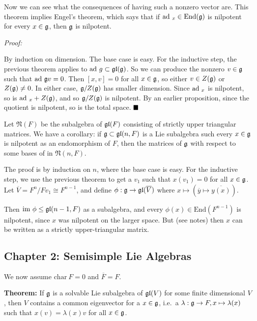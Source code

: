 Now we can see what the consequences of having such a nonzero vector
are. This theorem implies Engel's theorem, which says that if
\(\mathrm{ad}~_x \in \mathrm{End}({\mathfrak{g}})\) is nilpotent for every \(x\in {\mathfrak{g}}\),
then \({\mathfrak{g}}\) is nilpotent.

\emph{Proof:}

By induction on dimension. The base case is easy. For the inductive
step, the previous theorem applies to \(\mathrm{ad}~ g \subset {\mathfrak{gl}}({\mathfrak{g}})\).
So we can produce the nonzero \(v\in {\mathfrak{g}}\) such that
\(\mathrm{ad}~ {\mathfrak{g}} v = 0\). Then \([x, v] = 0\) for all \(x\in{\mathfrak{g}}\), so
either \(v\in Z({\mathfrak{g}})\) or \(Z({\mathfrak{g}}) \neq 0\). In either case,
\({\mathfrak{g}} / Z({\mathfrak{g}})\) has smaller dimension. Since \(\mathrm{ad}~_x\) is
nilpotent, so is \(\mathrm{ad}~_x + Z({\mathfrak{g}})\), and so \({\mathfrak{g}}/Z({\mathfrak{g}})\) is
nilpotent. By an earlier proposition, since the quotient is nilpotent,
so is the total space. \(\qed\)

Let \(\mathfrak{N}(F)\) be the subalgebra of \({\mathfrak{gl}}(F)\) consisting of
strictly upper triangular matrices. We have a corollary: if
\({\mathfrak{g}} \subset {\mathfrak{gl}}(n, F)\) is a Lie subalgebra such every
\(x\in {\mathfrak{g}}\) is nilpotent as an endomorphism of \(F\), then the
matrices of \({\mathfrak{g}}\) with respect to some bases of in
\(\mathfrak{N}(n, F)\).

The proof is by induction on \(n\), where the base case is easy. For the
inductive step, we use the previous theorem to get a \(v_1\) such that
\(x(v_1) = 0\) for all \(x\in {\mathfrak{g}}\). Let
\(\overline V = F^n/Fv_1 \cong F^{n-1}\), and define
\(\phi: {\mathfrak{g}} \to {\mathfrak{gl}}(\overline V)\) where
\(x \mapsto (\overline y \mapsto \overline{y(x)})\).

Then \({\text{im}~} \phi \leq {\mathfrak{gl}}(n-1, F)\) as a subalgebra, and every
\(\phi(x)\in \mathrm{End}(F^{n-1})\) is nilpotent, since \(x\) was
nilpotent on the larger space. But (see notes) then \(x\) can be written
as a strictly upper-triangular matrix.

\hypertarget{chapter-2-semisimple-lie-algebras}{%
\subsection{Chapter 2: Semisimple Lie
Algebras}\label{chapter-2-semisimple-lie-algebras}}

We now assume \(\mathrm{char} ~F = 0\) and \(\overline F = F\).

\textbf{Theorem:} If \({\mathfrak{g}}\) is a solvable Lie subalgebra of
\({\mathfrak{gl}}(V)\) for some finite dimensional \(V\), then \(V\) contains a
common eigenvector for a \(x\in{\mathfrak{g}}\), i.e.~a
\(\lambda: {\mathfrak{g}} \to F, x \mapsto \lambda(x)\) such that
\(x(v) = \lambda(x) v\) for all \(x\in{\mathfrak{g}}\).

